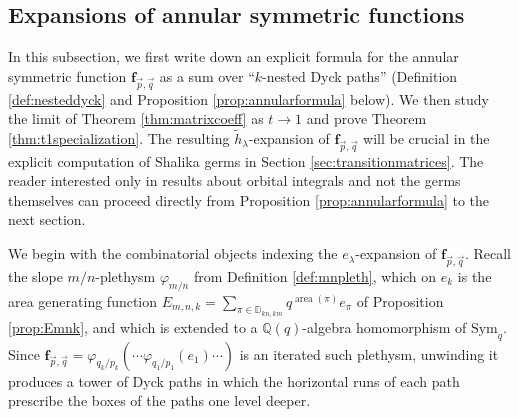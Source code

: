 \documentclass{amsart}
\numberwithin{equation}{section}
\theoremstyle{definition}
\newtheorem{remark}[lemma]{Remark}%
\def\tilde{\widetilde}
\def\Sym{{\mathrm{Sym}}}
\renewcommand{\th}{\tilde{h}}
\newcommand{\frs}{\mathbf{f}_{\vec{p},\vec{q}}}
\newcommand{\fpq}{\frs}
\newcommand{\fgamma}{\mathbf{f}_{\gamma}}
\newcommand{\Q}{{\mathbb Q}}
\newcommand{\Dyck}{\mathbb{D}}
\DeclareMathOperator{\area}{\mathrm{area}}
\begin{document}


\subsection{Expansions of annular symmetric functions}
\label{subsec:weightformulas}

In this subsection, we first write down an explicit formula for the annular symmetric function $\fpq$ as a sum over ``$k$-nested Dyck paths'' (Definition \ref{def:nesteddyck} and Proposition \ref{prop:annularformula} below). We then study the limit of Theorem \ref{thm:matrixcoeff} as $t\to 1$ and prove Theorem \ref{thm:t1specialization}. The resulting $\th_\lambda$-expansion of $\fpq$ will be crucial in the explicit computation of Shalika germs in Section \ref{sec:transitionmatrices}. %
The reader interested only in results about orbital integrals and not the germs themselves can proceed directly from Proposition \ref{prop:annularformula} to the next section.

We begin with the combinatorial objects indexing the $e_\lambda$-expansion of $\fpq$. Recall the slope $m/n$-plethysm $\varphi_{m/n}$ from Definition \ref{def:mnpleth}, which on $e_k$ is the area generating function $E_{m,n,k}=\sum_{\pi\in\Dyck_{kn,km}}q^{\area(\pi)}e_\pi$ of Proposition \ref{prop:Emnk}, and which is extended to a $\Q(q)$-algebra homomorphism of $\Sym_q$. Since $\fpq=\varphi_{q_k/p_k}(\cdots\varphi_{q_1/p_1}(e_1)\cdots)$ is an iterated such plethysm, unwinding it produces a tower of Dyck paths in which the horizontal runs of each path prescribe the boxes of the paths one level deeper.
\end{document}
